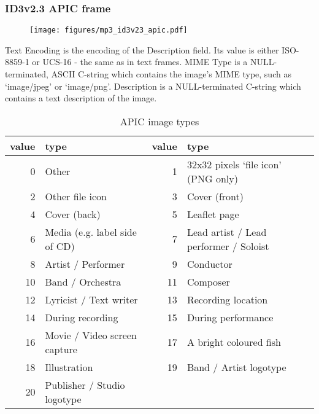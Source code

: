 \subsubsection{ID3v2.3 APIC frame}
\begin{figure}[h]
\texttt{[image: figures/mp3\_id3v23\_apic.pdf]}
\end{figure}
Text Encoding is the encoding of the Description field.
Its value is either ISO-8859-1 or UCS-16 - the same as in
text frames.
MIME Type is a NULL-terminated, ASCII C-string which contains the
image's MIME type, such as `image/jpeg' or `image/png'.
Description is a NULL-terminated C-string which contains
a text description of the image.
\begin{table}[h]
{
\begin{tabular}{|r|l||r|l|}
\hline
value & type & value & type \\
\hline
0 & Other & 1 & 32x32 pixels `file icon' (PNG only) \\
2 & Other file icon & 3 & Cover (front) \\
4 & Cover (back) & 5 & Leaflet page \\
6 & Media (e.g. label side of CD) & 7 & Lead artist / Lead performer / Soloist \\
8 & Artist / Performer & 9 & Conductor \\
10 & Band / Orchestra & 11 & Composer \\
12 & Lyricist / Text writer & 13 & Recording location \\
14 & During recording & 15 & During performance \\
16 & Movie / Video screen capture & 17 & A bright coloured fish \\
18 & Illustration & 19 & Band / Artist logotype \\
20 & Publisher / Studio logotype & &  \\
\hline
\end{tabular}
\caption{APIC image types}
}
\end{table}
